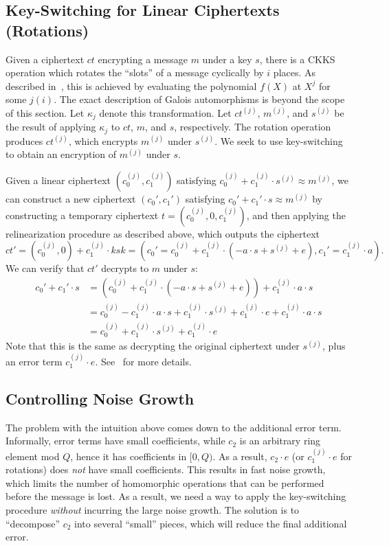 \documentclass[../../fheimpl.tex]{subfiles}
\begin{document}
\subsection{Key-Switching for Linear Ciphertexts (Rotations)}
Given a ciphertext $ct$ encrypting a message $m$ under a key $s$, there is a CKKS operation which rotates the ``slots'' of a message cyclically by $i$ places. As described in~\cite[Section 2.2]{cryptoeprint:2012/099}, this is achieved by evaluating the polynomial $f(X)$ at $X^j$ for some $j(i)$. The exact description of Galois automorphisms is beyond the scope of this section. Let $\kappa_j$ denote this transformation. Let $ct^{(j)}$, $m^{(j)}$, and $s^{(j)}$ be the result of applying $\kappa_j$ to $ct$, $m$, and $s$, respectively. The rotation operation produces $ct^{(j)}$, which encrypts $m^{(j)}$ under $s^{(j)}$. We seek to use key-switching to obtain an encryption of $m^{(j)}$ under $s$.

Given a linear ciphertext $(c_0^{(j)}, c_1^{(j)})$ satisfying $c_0^{(j)} + c_1^{(j)}\cdot s^{(j)} \approx m^{(j)}$, we can construct a new ciphertext $(c_0', c_1')$ satisfying $c_0' + c_1'\cdot s \approx m^{(j)}$ by constructing a temporary ciphertext $t=(c_0^{(j)}, 0, c_1^{(j)})$, and then applying the relinearization procedure as described above, which outputs the ciphertext
\[ct' = (c_0^{(j)}, 0) + c_1^{(j)}\cdot ksk = (c_0'=c_0^{(j)} + c_1^{(j)}\cdot(-a\cdot s + s^{(j)} + e), c_1'=c_1^{(j)}\cdot a).\]
We can verify that $ct'$ decrypts to $m$ under $s$:
\begin{align*}
	c_0' + c_1'\cdot s &= (c_0^{(j)} + c_1^{(j)}\cdot(-a\cdot s + s^{(j)} + e)) + c_1^{(j)}\cdot a\cdot s \\
	&= c_0^{(j)} - c_1^{(j)}\cdot a\cdot s + c_1^{(j)}\cdot s^{(j)} + c_1^{(j)}\cdot e + c_1^{(j)}\cdot a\cdot s \\
	&= c_0^{(j)} + c_1^{(j)}\cdot s^{(j)} + c_1^{(j)}\cdot e
\end{align*}
Note that this is the same as decrypting the original ciphertext under $s^{(j)}$, plus an error term $c_1^{(j)}\cdot e$. See~\cite[Appendix B]{cryptoeprint:2012/099} for more details.

\subsection{Controlling Noise Growth}
\label{sec:ksnoisecontrol}
The problem with the intuition above comes down to the additional error term. Informally, error terms have small coefficients, while $c_2$ is an arbitrary ring element mod $Q$, hence it has coefficients in $[0,Q)$. As a result, $c_2\cdot e$ (or $c_1^{(j)}\cdot e$ for rotations) does \emph{not} have small coefficients. This results in fast noise growth, which limits the number of homomorphic operations that can be performed before the message is lost. As a result, we need a way to apply the key-switching procedure \emph{without} incurring the large noise growth. The solution is to ``decompose'' $c_2$ into several ``small'' pieces, which will reduce the final additional error.
\end{document}

